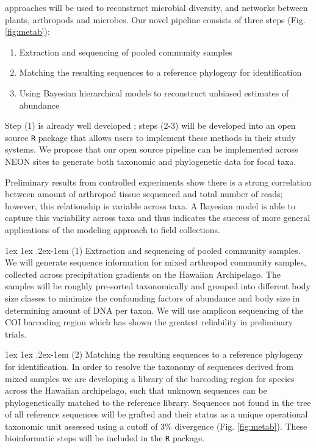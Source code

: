 \documentclass[11pt]{article}
\makeatletter
\renewcommand{\paragraph}{\@startsection{paragraph}{4}{\z@}
  {1ex \@plus 1ex \@minus .2ex}{-1em}
  {\normalfont\normalsize\it}
}
\makeatother
\begin{document}
%
approaches will be used to reconstruct microbial diversity, and
networks between plants, arthropods and microbes. Our novel pipeline
consists of three steps (Fig. \ref{fig:metab}):
\begin{enumerate}
\item Extraction and sequencing of pooled community samples
\item Matching the resulting sequences to a reference phylogeny for
  identification
\item Using Bayesian hierarchical models to reconstruct unbiased
  estimates of abundance
\end{enumerate}

Step (1) is already well developed \citep{krehenwinkel2016,
  shokralla2015, gibson2014, taberlet2012}; steps (2-3) will be
developed into an open source {\tt R} package that allows users to
implement these methods in their study systems.  We propose that our
open source pipeline can be implemented across NEON sites to generate
both taxonomic and phylogenetic data for focal taxa.

Preliminary results from controlled experiments show there is a strong
correlation between amount of arthropod tissue sequenced and total
number of reads; however, this relationship is variable across taxa. A
Bayesian model is able to capture this variability across taxa and
thus indicates the success of more general applications of the
modeling approach to field collections.

\paragraph{(1) Extraction and sequencing of pooled community samples.}
We will generate sequence information for mixed arthropod community
samples, collected across precipitation gradients on the Hawaiian
Archipelago. The samples will be roughly pre-sorted taxonomically and
grouped into different body size classes to minimize the confounding
factors of abundance and body size in determining amount of DNA per
taxon. We will use amplicon sequencing of the COI barcoding region
\citep{taberlet2012} which has shown the greatest reliability in
preliminary trials.


\paragraph{(2) Matching the resulting sequences to a reference
  phylogeny for identification.}
In order to resolve the taxonomy of sequences derived from mixed
samples we are developing a library of the barcoding region for
species across the Hawaiian archipelago, such that unknown sequences
can be phylogenetically matched to the reference library.
Sequences not found in the tree of all reference sequences will be
grafted and their status as a unique operational taxonomic unit
assessed using a cutoff of 3\% divergence (Fig. \ref{fig:metab}).
These bioinformatic steps will be included in the {\tt R} package.
\end{document}
